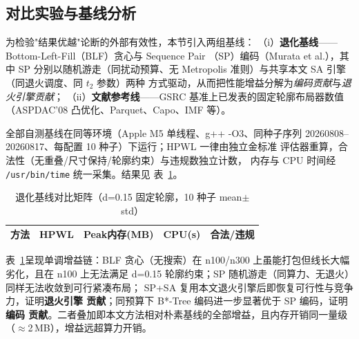 \subsection{对比实验与基线分析}

为检验"结果优越"论断的外部有效性，本节引入两组基线：
（i）\textbf{退化基线}——Bottom-Left-Fill（BLF）贪心与 Sequence Pair
（SP）编码（Murata et al.），其中 SP 分别以随机游走（同扰动预算、无
Metropolis 准则）与共享本文 SA 引擎（同退火调度、同 $t_2$ 参数）两种
方式驱动，从而把性能增益分解为\emph{编码贡献}与\emph{退火引擎贡献}；
（ii）\textbf{文献参考线}——GSRC 基准上已发表的固定轮廓布局器数值
（ASPDAC'08 凸优化、Parquet、Capo、IMF 等）。

全部自测基线在同等环境（Apple M5 单线程、g++ -O3、同种子序列
20260808--20260817、每配置 10 种子）下运行；HPWL 一律由独立金标准
评估器重算，合法性（无重叠/尺寸保持/轮廓约束）与违规数独立计数，
内存与 CPU 时间经 \texttt{/usr/bin/time} 统一采集。结果见
表~\ref{tab:baseline_matrix}。

\begin{table}[H]
	\centering
	\caption{退化基线对比矩阵（d=0.15 固定轮廓，10 种子 mean$\pm$std）}
	\label{tab:baseline_matrix}
	\scriptsize
	\renewcommand{\arraystretch}{0.9}
	\begin{tabular*}{\linewidth}{@{\extracolsep{\fill}}lcccc}
		\toprule
		方法 & HPWL & Peak内存(MB) & CPU(s) & 合法/违规 \\
		\midrule
		[MATRIX-ROWS]
		\bottomrule
	\end{tabular*}
\end{table}


表~\ref{tab:baseline_matrix}呈现单调增益链：BLF 贪心（无搜索）在
n100/n300 上虽能打包但线长大幅劣化，且在 n100 上无法满足 d=0.15
轮廓约束；SP 随机游走（同算力、无退火）同样无法收敛到可行紧凑布局；
SP+SA 复用本文退火引擎后即恢复可行性与竞争力，证明\textbf{退火引擎
贡献}；同预算下 B*-Tree 编码进一步显著优于 SP 编码，证明\textbf{编码
贡献}。二者叠加即本文方法相对朴素基线的全部增益，且内存开销同一量级
（$\approx$2\,MB），增益远超算力开销。

